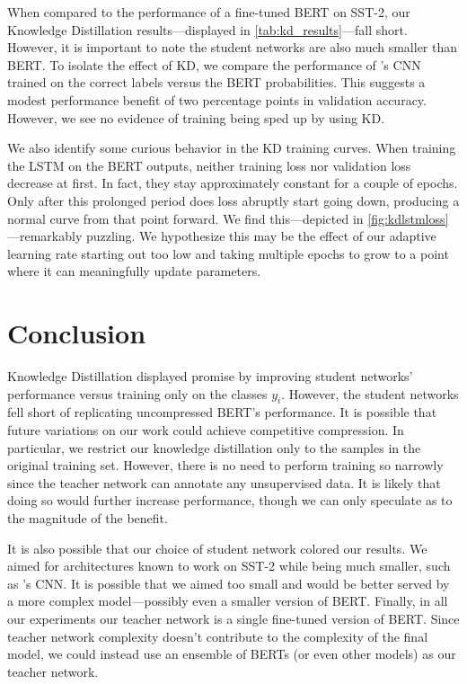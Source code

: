 \documentclass[10pt]{article}
\begin{document}
When compared to the performance of a fine-tuned BERT on SST-2, our Knowledge
Distillation results---displayed in \cref{tab:kd_results}---fall short. However,
it is important to note the student networks are also much smaller than BERT. To
isolate the effect of KD, we compare the performance of
\citet{kim2014convolutional}'s CNN trained on the correct labels versus the BERT
probabilities. This suggests a modest performance benefit of two percentage
points in validation accuracy. However, we see no evidence of training being
sped up by using KD.

We also identify some curious behavior in the KD training curves. When training
the LSTM on the BERT outputs, neither training loss nor validation loss decrease
at first. In fact, they stay approximately constant for a couple of epochs. Only
after this prolonged period does loss abruptly start going down, producing a
normal curve from that point forward. We find this---depicted in
\cref{fig:kdlstmloss}---remarkably puzzling. We hypothesize this may be the
effect of our adaptive learning rate starting out too low and taking multiple
epochs to grow to a point where it can meaningfully update parameters. 

\section{Conclusion}

Knowledge Distillation displayed promise by improving student networks'
performance versus training only on the classes $y_i$. However, the student
networks fell short of replicating uncompressed BERT's performance. It is
possible that future variations on our work could achieve competitive
compression. In particular, we restrict our knowledge distillation only to the
samples in the original training set. However, there is no need to perform
training so narrowly since the teacher network can annotate any unsupervised
data. It is likely that doing so would further increase performance, though we
can only speculate as to the magnitude of the benefit.

It is also possible that our choice of student network colored our results. We
aimed for architectures known to work on SST-2 while being much smaller, such as
\citet{kim2014convolutional}'s CNN. It is possible that we aimed too small and
would be better served by a more complex model---possibly even a smaller version
of BERT. Finally, in all our experiments our teacher network is a single
fine-tuned version of BERT. Since teacher network complexity doesn't contribute
to the complexity of the final model, we could instead use an ensemble of BERTs
(or even other models) as our teacher network.
\end{document}
